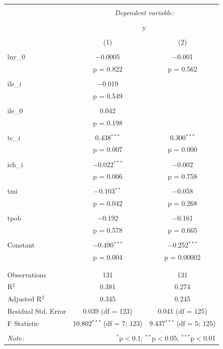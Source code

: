 \begin{table}[!htbp] \centering 
    \tiny
  \caption{} 
  \label{} 
\begin{tabular}{@{\extracolsep{5pt}}lcc} 
\\[-1.8ex]\hline 
\hline \\[-1.8ex] 
 & \multicolumn{2}{c}{\textit{Dependent variable:}} \\ 
\cline{2-3} 
\\[-1.8ex] & \multicolumn{2}{c}{y} \\ 
\\[-1.8ex] & (1) & (2)\\ 
\hline \\[-1.8ex] 
 lny\_0 & $-$0.0005 & $-$0.001 \\ 
  & p = 0.822 & p = 0.562 \\ 
  & & \\ 
 ile\_i & $-$0.019 &  \\ 
  & p = 0.549 &  \\ 
  & & \\ 
 ile\_0 & 0.042 &  \\ 
  & p = 0.198 &  \\ 
  & & \\ 
 tc\_i & 0.438$^{***}$ & 0.300$^{***}$ \\ 
  & p = 0.007 & p = 0.000 \\ 
  & & \\ 
 ich\_i & $-$0.022$^{***}$ & $-$0.002 \\ 
  & p = 0.006 & p = 0.758 \\ 
  & & \\ 
 tmi & $-$0.103$^{**}$ & $-$0.058 \\ 
  & p = 0.042 & p = 0.268 \\ 
  & & \\ 
 tpob & $-$0.192 & $-$0.161 \\ 
  & p = 0.578 & p = 0.665 \\ 
  & & \\ 
 Constant & $-$0.490$^{***}$ & $-$0.252$^{***}$ \\ 
  & p = 0.004 & p = 0.00002 \\ 
  & & \\ 
\hline \\[-1.8ex] 
Observations & 131 & 131 \\ 
R$^{2}$ & 0.381 & 0.274 \\ 
Adjusted R$^{2}$ & 0.345 & 0.245 \\ 
Residual Std. Error & 0.039 (df = 123) & 0.041 (df = 125) \\ 
F Statistic & 10.802$^{***}$ (df = 7; 123) & 9.437$^{***}$ (df = 5; 125) \\ 
\hline 
\hline \\[-1.8ex] 
\textit{Note:}  & \multicolumn{2}{r}{$^{*}$p$<$0.1; $^{**}$p$<$0.05; $^{***}$p$<$0.01} \\ 
\end{tabular} 
\end{table}



